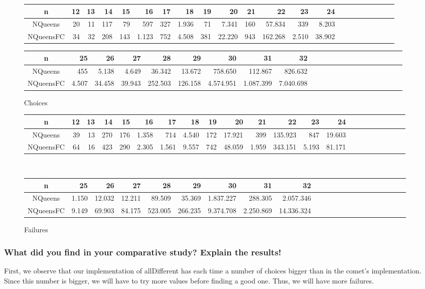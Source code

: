 \documentclass[a4paper ,12pt,french]{article}
\begin{document}
\begin{figure}[!h]\hspace{-1cm}
\begin{tabular}{|c||r|r|r|r|r|r|r|r|r|r|r|r|r|r|r|r|r|r|r|r|r|}
\hline
n&12&13&14&15&16&17&18&19&20&21&22 &23&24  \\
\hline\hline
NQueens &20&11&117&79&597&327&1.936&71&7.341&160&57.834 &339 &8.203   \\
\hline
NQueensFC &34&32&208&143&1.123&752&4.508&381&22.220&943& 162.268 &2.510 &38.902\\
\hline
\end{tabular}
\begin{tabular}{|c||r|r|r|r|r|r|r|r|r|r|r|r|r|r|r|r|r|r|r|r|r|}
\hline
n&25&26&27&28&29&30&31&32   \\
\hline\hline
NQueens &455&5.138&4.649&36.342&13.672&758.650&112.867&826.632     \\
\hline
NQueensFC &4.507&34.458&39.943&252.503&126.158&4.574.951&1.087.399&7.040.698  \\
\hline
\end{tabular}
\caption{Choices}
\end{figure}
\begin{figure}[!h]\hspace{-1.2cm}
\begin{tabular}{|c||r|r|r|r|r|r|r|r|r|r|r|r|r|r|r|r|r|r|r|r|r|}
\hline
n&12&13&14&15&16&17&18&19&20&21&22 &23&24  \\
\hline\hline
NQueens &39&13&270&176&1.358&714&4.540&172&17.921&399&135.923&847&19.603    \\
\hline
NQueensFC &64&16&423&290&2.305&1.561&9.557&742&48.059&1.959&343.151& 5.193 &81.171    \\
\hline
\end{tabular}
\\
\begin{tabular}{|c||r|r|r|r|r|r|r|r|r|r|r|r|r|r|r|r|r|r|r|r|r|}
\hline
n&25&26&27&28&29&30&31&32   \\
\hline\hline
NQueens &1.150&12.032&12.211&89.509&35.369&1.837.227&288.305&2.057.346    \\
\hline
NQueensFC &9.149&69.903& 84.175&523.005&266.235& 9.374.708&2.250.869&14.336.324 \\
\hline
\end{tabular}
\caption{Failures}
\end{figure}



\newpage
\subsubsection{What did you find in your comparative study? Explain the results!}

First, we observe that our implementation of allDifferent has each time a number of choices bigger than in the comet's implementation. Since this number is bigger, we will have to try more values before finding a good one. Thus, we will have more failures.
\end{document}
